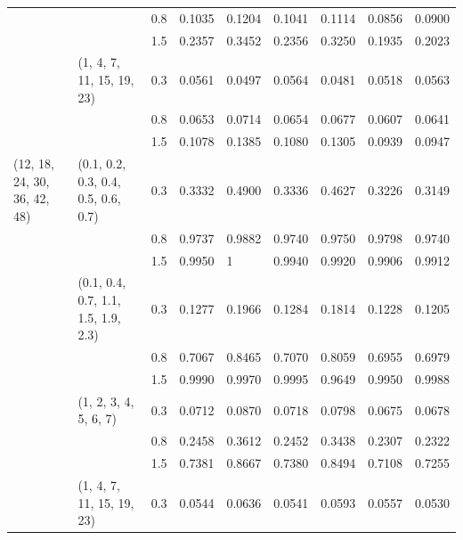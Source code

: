 \begin{table}[h]
\begin{tabular}{lllllllll}
                             			&                                     			& 0.8   	& 0.1035 	& 0.1204 	& 0.1041 	& 0.1114 	& 0.0856 	& 0.0900 \\
                             			&                                     			& 1.5   	& 0.2357 	& 0.3452 	& 0.2356 	& 0.3250 	& 0.1935 	& 0.2023 \\
                            		 	& (1, 4, 7, 11, 15, 19, 23)           		& 0.3   	& 0.0561 	& 0.0497 	& 0.0564 	& 0.0481 	& 0.0518 	& 0.0563 \\
                             			&                                     			& 0.8   	& 0.0653 	& 0.0714 	& 0.0654 	& 0.0677 	& 0.0607 	& 0.0641 \\
                             			&                                     			& 1.5   	& 0.1078 	& 0.1385 	& 0.1080 	& 0.1305 	& 0.0939 	& 0.0947 \\\hline
(12, 18, 24, 30, 36, 42, 48) 	& (0.1, 0.2, 0.3, 0.4, 0.5, 0.6, 0.7) 	& 0.3   	& 0.3332 	& 0.4900 	& 0.3336 	& 0.4627 	& 0.3226 	& 0.3149 \\
                          				&                                     			& 0.8   	& 0.9737 	& 0.9882 	& 0.9740 	& 0.9750 	& 0.9798 	& 0.9740 \\
                             			&                                     			& 1.5   	& 0.9950 	& 1	 	& 0.9940 	& 0.9920 	& 0.9906 	& 0.9912 \\
                             			& (0.1, 0.4, 0.7, 1.1, 1.5, 1.9, 2.3) 	& 0.3   	& 0.1277 	& 0.1966 	& 0.1284 	& 0.1814 	& 0.1228 	& 0.1205 \\
                             			&                                     			& 0.8   	& 0.7067 	& 0.8465 	& 0.7070 	& 0.8059 	& 0.6955 	& 0.6979 \\
                             			&                                     			& 1.5   	& 0.9990 	& 0.9970 	& 0.9995 	& 0.9649 	& 0.9950 	& 0.9988 \\
                             			& (1, 2, 3, 4, 5, 6, 7)               		& 0.3   	& 0.0712 	& 0.0870 	& 0.0718 	& 0.0798 	& 0.0675 	& 0.0678 \\
                             			&                                     			& 0.8   	& 0.2458 	& 0.3612 	& 0.2452 	& 0.3438 	& 0.2307 	& 0.2322 \\
                             			&                                     			& 1.5   	& 0.7381 	& 0.8667 	& 0.7380 	& 0.8494 	& 0.7108 	& 0.7255 \\
                             			& (1, 4, 7, 11, 15, 19, 23)           		& 0.3   	& 0.0544 	& 0.0636 	& 0.0541 	& 0.0593 	& 0.0557 	& 0.0530 \\

\end{tabular}
\end{table}
